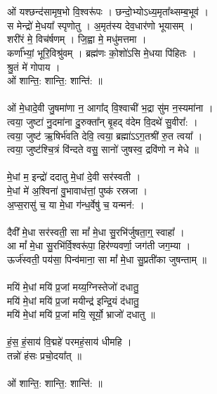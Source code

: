 \section{}
ओं यश्छन्द॑सामृष॒भो वि॒श्वरू॑पः । छन्दो॒भ्योऽध्य॒मृता᳚थ्सम्ब॒भूव॑ ।\\
स मेन्द्रो॑ मे॒धया᳚ स्पृणोतु । अ॒मृत॑स्य देव॒धार॑णो भूयासम् ।\\
शरी॑रं मे॒ विच॑र्षणम् । जि॒ह्वा मे॒ मधु॑मत्तमा ।\\
कर्णा᳚भ्यां॒ भूरि॒विश्रु॑वम् । ब्रह्म॑णः को॒शो॑ऽसि मे॒धया पि॑हितः ।\\
श्रु॒तं मे॑ गोपाय ।\\
ओं शान्ति॒: शान्ति॒: शान्ति॑: ॥\\
\\
ओं मे॒धादे॒वी जु॒षमा॑णा न॒ आगा᳚द् वि॒श्वाची॑ भ॒द्रा सु॑म न॒स्यमा॑ना ।\\
त्वया॒ जुष्टा॑ नु॒दमा॑ना दु॒रुक्ता᳚न् बृ॒हद् व॑देम वि॒दथे॑ सु॒वीरा᳚: ।\\
त्वया॒ जुष्ट॑ ऋ॒षिर्भ॑वति देवि॒ त्वया॒ ब्रह्मा॑ऽऽग॒तश्री॑ रु॒त त्वया᳚ ।\\
त्वया॒ जुष्ट॑श्चि॒त्रं वि॑न्दते वसु॒ सानो॑ जुषस्व॒ द्रवि॑णो न मेधे ॥\\
\\
मे॒धां म॒ इन्द्रो॑ ददातु मे॒धां दे॒वी सर॑स्वती ।\\
मे॒धां मे॑ अ॒श्विना॑ वु॒भावाध॑त्तां॒ पुष्क॑ रस्रजा ।\\
अ॒प्स॒रासु॑ च॒ या मे॒धा ग॑न्ध॒र्वेषु॑ च॒ यन्मन॑: ।\\
\\
दैवी᳚ मे॒धा सर॑स्वती॒ सा मां᳚ मे॒धा सु॒रभि॑र्जुषता॒ग्॒ स्वाहा᳚ ।\\
आ मां᳚ मे॒धा सु॒रभि॑र्वि॒श्वरू॑पा॒ हिर॑ण्यवर्णा॒ जग॑ती जग॒म्या ।\\
ऊर्ज॑स्वती॒ पय॑सा॒ पिन्व॑माना॒ सा मां᳚ मे॒धा सु॒प्रती॑का जुषन्ताम् ॥\\
\\
मयि॑ मे॒धां मयि॑ प्र॒जां मय्य॒ग्निस्तेजो॑ दधातु॒\\
मयि॑ मे॒धां मयि॑ प्र॒जां मयीन्द्र॑ इन्द्रि॒यं द॑धातु॒\\
मयि॑ मे॒धां मयि॑ प्र॒जां मयि॒ सूर्यो॒ भ्राजो॑ दधातु ॥\\
\\
हं॒स॒ हं॒साय॑ वि॒द्महे॑ परमहं॒साय॑ धीमहि ।\\
तन्नो॑ हंसः प्रचो॒दया᳚त् ॥\\
\\
ओं शान्ति॒: शान्ति॒: शान्ति॑: ॥\\
